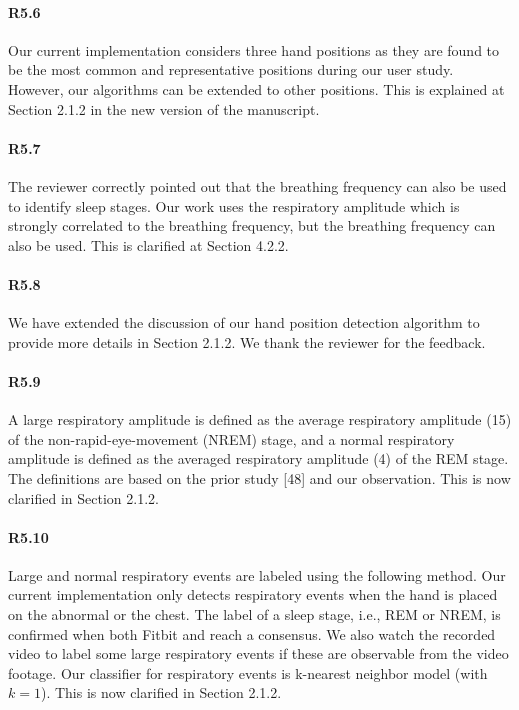 \paragraph{R5.6} Our current implementation considers three hand positions as they are found to be the most common and representative
positions during our user study. However, our algorithms can be extended to other positions. This is explained at Section 2.1.2 in the new
version of the manuscript.

\paragraph{R5.7} The reviewer correctly pointed out that the breathing frequency can also be used to identify sleep stages. Our work uses
the respiratory amplitude which is strongly correlated to the breathing frequency, but the breathing frequency can also be used. This is
clarified at Section 4.2.2.

\paragraph{R5.8} We have extended the discussion of our hand position detection algorithm to provide more details in Section 2.1.2. We
thank the reviewer for the feedback.

\paragraph{R5.9} A large respiratory amplitude is defined as the average respiratory amplitude (15) of the
non-rapid-eye-movement (NREM) stage, and a normal respiratory amplitude is defined as the averaged respiratory amplitude (4) of the REM
stage. The definitions are based on the prior study [48] and our observation. This is now clarified in Section 2.1.2.


\paragraph{R5.10} Large and normal respiratory events are labeled using the following method. Our current implementation only detects
respiratory events when the hand is placed on the abnormal or the chest. The label of a sleep stage, i.e., REM or NREM, is confirmed when
both Fitbit and \systemname reach a consensus. We also watch the recorded video to label some large respiratory events if these are
observable from the video footage. Our classifier for respiratory events is k-nearest neighbor model (with $k=1$). This is now
clarified in Section 2.1.2.



